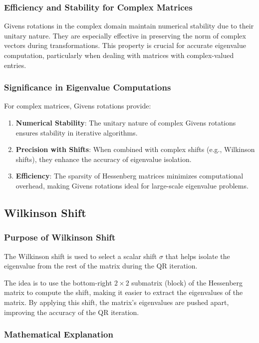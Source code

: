 \documentclass[12pt]{article}
\numberwithin{equation}{subsubsection}
\begin{document}
\subsubsection{Efficiency and Stability for Complex Matrices}

Givens rotations in the complex domain maintain numerical stability due to their unitary nature. They are especially effective in preserving the norm of complex vectors during transformations. This property is crucial for accurate eigenvalue computation, particularly when dealing with matrices with complex-valued entries.

\subsubsection{Significance in Eigenvalue Computations}

For complex matrices, Givens rotations provide:
\begin{enumerate}
	\item \textbf{Numerical Stability}: The unitary nature of complex Givens rotations ensures stability in iterative algorithms.
	\item \textbf{Precision with Shifts}: When combined with complex shifts (e.g., Wilkinson shifts), they enhance the accuracy of eigenvalue isolation.
	\item \textbf{Efficiency}: The sparsity of Hessenberg matrices minimizes computational overhead, making Givens rotations ideal for large-scale eigenvalue problems.
\end{enumerate}


\subsection{Wilkinson Shift}
\subsubsection{Purpose of Wilkinson Shift}
The Wilkinson shift is used to select a scalar shift $ \sigma $ that helps isolate the eigenvalue from the rest of the matrix during the QR iteration.

The idea is to use the bottom-right $2\times2$ submatrix (block) of the Hessenberg matrix to compute the shift, making it easier to extract the eigenvalues of the matrix. By applying this shift, the matrix's eigenvalues are pushed apart, improving the accuracy of the QR iteration.

\subsubsection{Mathematical Explanation}
\end{document}
